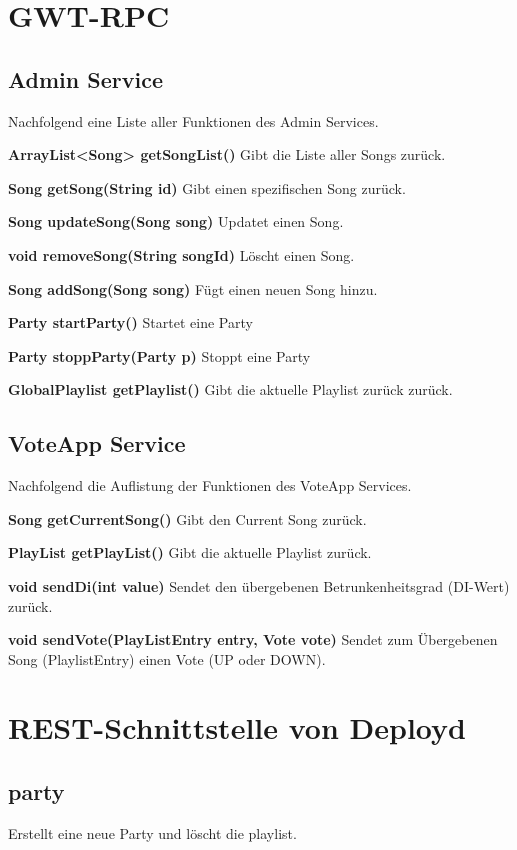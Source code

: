 \section{GWT-RPC}

\subsection{Admin Service}

Nachfolgend eine Liste aller Funktionen des Admin Services.

\textbf{ArrayList<Song> getSongList()}
Gibt die Liste aller Songs zurück.

\textbf{Song getSong(String id)}
Gibt einen spezifischen Song zurück.

\textbf{Song updateSong(Song song)}
Updatet einen Song.

\textbf{void removeSong(String songId)}
Löscht einen Song.

\textbf{Song addSong(Song song)}
Fügt einen neuen Song hinzu.

\textbf{Party startParty()}
Startet eine Party

\textbf{Party stoppParty(Party p) }
Stoppt eine Party

\textbf{GlobalPlaylist getPlaylist()}
Gibt die aktuelle Playlist zurück zurück.


\subsection{VoteApp Service}

Nachfolgend die Auflistung der Funktionen des VoteApp Services.

\textbf{Song getCurrentSong()}
Gibt den Current Song zurück.

\textbf{PlayList getPlayList()}
Gibt die aktuelle Playlist zurück.

\textbf{void sendDi(int value)}
Sendet den übergebenen Betrunkenheitsgrad (DI-Wert) zurück.

\textbf{void sendVote(PlayListEntry entry, Vote vote)}
Sendet zum Übergebenen Song (PlaylistEntry) einen Vote (UP oder DOWN).

\section{REST-Schnittstelle von Deployd}

\subsection{party}
\label{service:party}
Erstellt eine neue Party und löscht die playlist.

